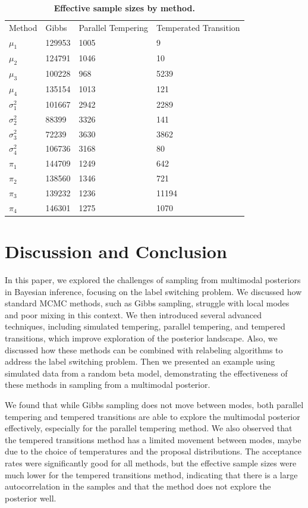 \documentclass[11pt]{article}
\begin{document}
\begin{table}[!ht]

\caption{\textbf{Effective sample sizes by method.}}
\centering
\begin{tabular}[t]{llll}
\toprule
Method & Gibbs & Parallel Tempering & Temperated Transition\\
$\mu_1$ & 129953 & 1005 & 9 \\
$\mu_2$ & 124791 & 1046 & 10\\
$\mu_3$ & 100228 & 968 & 5239\\
$\mu_4$ & 135154 & 1013 & 121\\
\addlinespace
$\sigma_1^2$ & 101667 & 2942 & 2289\\
$\sigma_2^2$ & 88399 & 3326 & 141\\
$\sigma_3^2$ & 72239 & 3630 & 3862\\
$\sigma_4^2$ & 106736 & 3168 & 80\\
\addlinespace
$\pi_1$ & 144709 & 1249 & 642 \\
$\pi_2$ & 138560 & 1346 & 721 \\
$\pi_3$ & 139232 & 1236 & 11194 \\
$\pi_4$ & 146301 & 1275 & 1070 \\
\bottomrule
\end{tabular}
\label{tab:effective_sample_sizes}
\end{table}

\section{Discussion and Conclusion}

In this paper, we explored the challenges of sampling from multimodal posteriors in Bayesian inference, 
focusing on the label switching problem. We discussed how standard MCMC methods, such as Gibbs sampling,
struggle with local modes and poor mixing in this context. We then introduced several advanced techniques,
including simulated tempering, parallel tempering, and tempered transitions, which improve exploration of the
posterior landscape. Also, we discussed how these methods can be combined with relabeling algorithms to address
the label switching problem. Then we presented an example using simulated data from a random beta model, 
demonstrating the effectiveness of these methods in sampling from a multimodal posterior. 

We found that while Gibbs sampling does not move between modes, both parallel tempering and tempered transitions
are able to explore the multimodal posterior effectively, especially for the parallel tempering method. We also
observed that the tempered transitions method has a limited movement between modes, maybe due to the choice of
temperatures and the proposal distributions. The acceptance rates were significantly good for all methods, but
the effective sample sizes were much lower for the tempered transitions method, indicating that there is a
large autocorrelation in the samples and that the method does not explore the posterior well.
\end{document}
